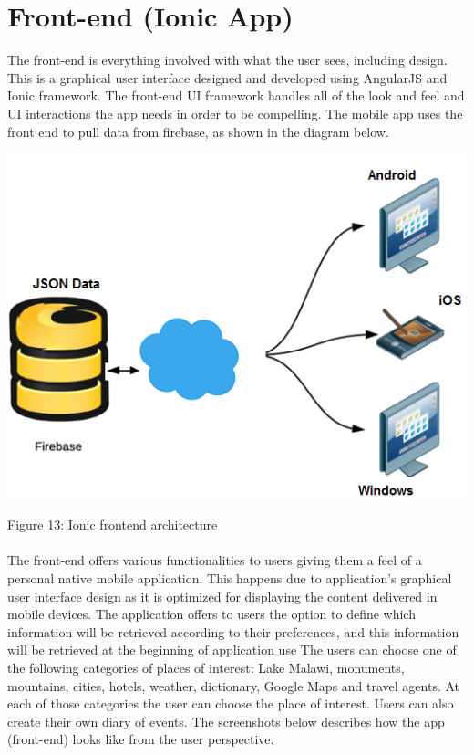 \paragraph{}

\section{Front-end (Ionic App)}
The front-end is everything involved with what the user sees, including design. This is a graphical user interface designed and developed using AngularJS and Ionic framework. The front-end UI framework handles all of the look and feel and UI interactions the app needs in order to be compelling.
The mobile app uses the front end to pull data from firebase, as shown in the diagram below.

\begin{center}    
	\includegraphics{img/frontend.png}
\end{center}
\begin{center}
	Figure 13: Ionic frontend architecture 
\end{center}
\paragraph{}
The front-end offers various functionalities to users giving them a feel of a personal native mobile application. This happens due to application’s graphical user interface design as it is optimized for displaying the content delivered in mobile devices. The application offers to users the option to define which information will be retrieved according to their preferences, and this information will be retrieved at the beginning of application use
The users can choose one of the following categories of places of interest: Lake Malawi, monuments, mountains, cities, hotels, weather, dictionary, Google Maps and travel agents. At each of those categories the user can choose the place of interest. Users can also create their own diary of events. The screenshots below describes how the app (front-end) looks like from the user perspective.

